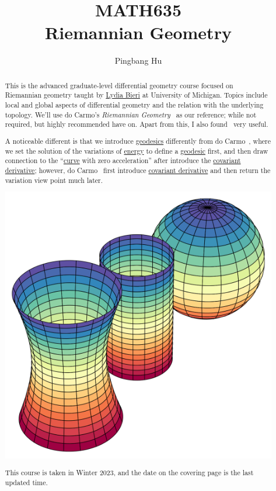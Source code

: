 \documentclass[a4paper]{report}
\author{Pingbang Hu}
\title{MATH635\\Riemannian Geometry}
\begin{document}
\maketitle

\begin{abstract}
	This is the advanced graduate-level differential geometry course focused on Riemannian geometry taught by \href{http://www-personal.umich.edu/~lbieri/}{Lydia Bieri} at University of Michigan. Topics include local and global aspects of differential geometry and the relation with the underlying topology. We'll use do Carmo's \emph{Riemannian Geometry}~\cite{flaherty2013riemannian} as our reference; while not required, but highly recommended have on. Apart from this, I also found~\cite{Frederic2015} very useful.

	A noticeable different is that we introduce \hyperref[def:geodesic]{geodesics} differently from do Carmo~\cite{flaherty2013riemannian}, where we set the solution of the variations of \hyperref[def:energy]{energy} to define a \hyperref[def:geodesic]{geodesic} first, and then draw connection to the ``\hyperref[def:curve]{curve} with zero acceleration'' after introduce the \hyperref[def:covariant-derivative]{covariant derivative}; however, do Carmo~\cite{flaherty2013riemannian} first introduce \hyperref[def:covariant-derivative]{covariant derivative} and then return the variation view point much later.

	\vfill
	\begin{center}
		\includegraphics[width=.8\linewidth]{Figures/cover.png}
	\end{center}
	\vfill
	This course is taken in Winter 2023, and the date on the covering page is the last updated time.
\end{abstract}
\end{document}
